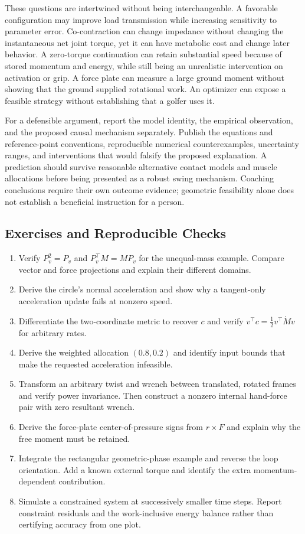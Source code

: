 These questions are intertwined without being interchangeable. A favorable configuration may improve load transmission while increasing sensitivity to parameter error. Co-contraction can change impedance without changing the instantaneous net joint torque, yet it can have metabolic cost and change later behavior. A zero-torque continuation can retain substantial speed because of stored momentum and energy, while still being an unrealistic intervention on activation or grip. A force plate can measure a large ground moment without showing that the ground supplied rotational work. An optimizer can expose a feasible strategy without establishing that a golfer uses it.

For a defensible argument, report the model identity, the empirical observation, and the proposed causal mechanism separately. Publish the equations and reference-point conventions, reproducible numerical counterexamples, uncertainty ranges, and interventions that would falsify the proposed explanation. A prediction should survive reasonable alternative contact models and muscle allocations before being presented as a robust swing mechanism. Coaching conclusions require their own outcome evidence; geometric feasibility alone does not establish a beneficial instruction for a person.

\subsection{Exercises and Reproducible Checks}

\begin{enumerate}
\item Verify $P_v^2=P_v$ and $P_v^\top M=MP_v$ for the unequal-mass example. Compare vector and force projections and explain their different domains.
\item Derive the circle's normal acceleration and show why a tangent-only acceleration update fails at nonzero speed.
\item Differentiate the two-coordinate metric to recover $c$ and verify $v^\top c=\tfrac12v^\top\dot Mv$ for arbitrary rates.
\item Derive the weighted allocation $(0.8,0.2)$ and identify input bounds that make the requested acceleration infeasible.
\item Transform an arbitrary twist and wrench between translated, rotated frames and verify power invariance. Then construct a nonzero internal hand-force pair with zero resultant wrench.
\item Derive the force-plate center-of-pressure signs from $r\times F$ and explain why the free moment must be retained.
\item Integrate the rectangular geometric-phase example and reverse the loop orientation. Add a known external torque and identify the extra momentum-dependent contribution.
\item Simulate a constrained system at successively smaller time steps. Report constraint residuals and the work-inclusive energy balance rather than certifying accuracy from one plot.
\end{enumerate}
